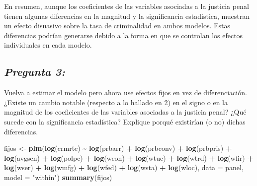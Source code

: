 \documentclass[
  12pt,
]{article}
\newenvironment{Shaded}{\begin{snugshade}}{\end{snugshade}}
\newcommand{\AttributeTok}[1]{\textcolor[rgb]{0.13,0.29,0.53}{#1}}
\newcommand{\FunctionTok}[1]{\textcolor[rgb]{0.13,0.29,0.53}{\textbf{#1}}}
\newcommand{\NormalTok}[1]{#1}
\newcommand{\OtherTok}[1]{\textcolor[rgb]{0.56,0.35,0.01}{#1}}
\newcommand{\SpecialCharTok}[1]{\textcolor[rgb]{0.81,0.36,0.00}{\textbf{#1}}}
\newcommand{\StringTok}[1]{\textcolor[rgb]{0.31,0.60,0.02}{#1}}
\begin{document}
En resumen, aunque los coeficientes de las variables asociadas a la
justicia penal tienen algunas diferencias en la magnitud y la
significancia estadistica, muestran un efecto disuasivo sobre la tasa de
criminalidad en ambos modelos. Estas diferencias podrían generarse
debido a la forma en que se controlan los efectos individuales en cada
modelo.

\subsection{\texorpdfstring{\textbf{\emph{Pregunta
3:}}}{Pregunta 3:}}\label{pregunta-3}

Vuelva a estimar el modelo pero ahora use efectos fijos en vez de
diferenciación. ¿Existe un cambio notable (respecto a lo hallado en 2)
en el signo o en la magnitud de los coeficientes de las variables
asociadas a la justicia penal? ¿Qué sucede con la significancia
estadística? Explique porqué existirían (o no) dichas diferencias.

\begin{Shaded}
\begin{Highlighting}[]
\NormalTok{fijos }\OtherTok{\textless{}{-}} \FunctionTok{plm}\NormalTok{(}\FunctionTok{log}\NormalTok{(crmrte) }\SpecialCharTok{\textasciitilde{}} \FunctionTok{log}\NormalTok{(prbarr) }\SpecialCharTok{+} \FunctionTok{log}\NormalTok{(prbconv) }\SpecialCharTok{+} \FunctionTok{log}\NormalTok{(prbpris)  }\SpecialCharTok{+} 
               \FunctionTok{log}\NormalTok{(avgsen) }\SpecialCharTok{+} \FunctionTok{log}\NormalTok{(polpc) }\SpecialCharTok{+} \FunctionTok{log}\NormalTok{(wcon) }\SpecialCharTok{+} \FunctionTok{log}\NormalTok{(wtuc) }\SpecialCharTok{+} \FunctionTok{log}\NormalTok{(wtrd) }\SpecialCharTok{+} 
               \FunctionTok{log}\NormalTok{(wfir) }\SpecialCharTok{+} \FunctionTok{log}\NormalTok{(wser) }\SpecialCharTok{+} \FunctionTok{log}\NormalTok{(wmfg) }\SpecialCharTok{+} \FunctionTok{log}\NormalTok{(wfed) }\SpecialCharTok{+} \FunctionTok{log}\NormalTok{(wsta) }\SpecialCharTok{+} 
               \FunctionTok{log}\NormalTok{(wloc), }\AttributeTok{data =}\NormalTok{ panel, }\AttributeTok{model =} \StringTok{"within"}\NormalTok{)}
\FunctionTok{summary}\NormalTok{(fijos)}
\end{Highlighting}
\end{Shaded}
\end{document}
